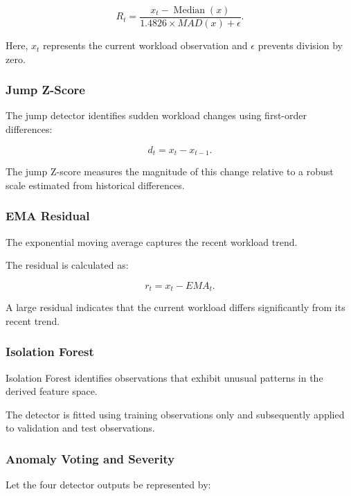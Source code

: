 \documentclass[conference]{IEEEtran}
\begin{document}
\begin{equation}
R_t =
\frac{x_t-\operatorname{Median}(x)}
{1.4826 \times MAD(x)+\epsilon}.
\end{equation}

Here, $x_t$ represents the current workload observation and $\epsilon$ prevents division by zero.

\subsubsection{Jump Z-Score}

The jump detector identifies sudden workload changes using first-order differences:

\begin{equation}
d_t=x_t-x_{t-1}.
\end{equation}

The jump Z-score measures the magnitude of this change relative to a robust scale estimated from historical differences.

\subsubsection{EMA Residual}

The exponential moving average captures the recent workload trend.

The residual is calculated as:

\begin{equation}
r_t=x_t-EMA_t.
\end{equation}

A large residual indicates that the current workload differs significantly from its recent trend.

\subsubsection{Isolation Forest}

Isolation Forest identifies observations that exhibit unusual patterns in the derived feature space.

The detector is fitted using training observations only and subsequently applied to validation and test observations.

\subsubsection{Anomaly Voting and Severity}

Let the four detector outputs be represented by:
\end{document}
